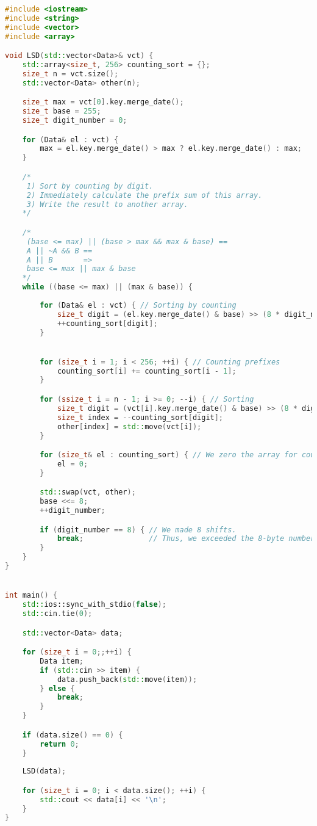 \begin{lstlisting}[language=C++]
#include <iostream>
#include <string>
#include <vector>
#include <array>

void LSD(std::vector<Data>& vct) {
    std::array<size_t, 256> counting_sort = {};
    size_t n = vct.size();
    std::vector<Data> other(n);

    size_t max = vct[0].key.merge_date();
    size_t base = 255;
    size_t digit_number = 0;

    for (Data& el : vct) {
        max = el.key.merge_date() > max ? el.key.merge_date() : max;
    }

    /*
     1) Sort by counting by digit.
     2) Immediately calculate the prefix sum of this array.
     3) Write the result to another array.
    */

    /*
     (base <= max) || (base > max && max & base) ==
     A || ~A && B ==
     A || B       =>
     base <= max || max & base
    */
    while ((base <= max) || (max & base)) {
        
        for (Data& el : vct) { // Sorting by counting
            size_t digit = (el.key.merge_date() & base) >> (8 * digit_number); // Specific number in the 256 system
            ++counting_sort[digit];
        }


        for (size_t i = 1; i < 256; ++i) { // Counting prefixes
            counting_sort[i] += counting_sort[i - 1];
        }

        for (ssize_t i = n - 1; i >= 0; --i) { // Sorting
            size_t digit = (vct[i].key.merge_date() & base) >> (8 * digit_number);
            size_t index = --counting_sort[digit];
            other[index] = std::move(vct[i]);
        }

        for (size_t& el : counting_sort) { // We zero the array for counting sorting.
            el = 0;
        }

        std::swap(vct, other);
        base <<= 8;
        ++digit_number;

        if (digit_number == 8) { // We made 8 shifts.
            break;               // Thus, we exceeded the 8-byte number.
        }
    }    
}


int main() {
    std::ios::sync_with_stdio(false);
    std::cin.tie(0);

    std::vector<Data> data;

    for (size_t i = 0;;++i) {
        Data item;
        if (std::cin >> item) {
            data.push_back(std::move(item));
        } else {
            break;
        }
    }

    if (data.size() == 0) {
        return 0;
    }
    
    LSD(data);

    for (size_t i = 0; i < data.size(); ++i) {
        std::cout << data[i] << '\n';
    }
}
\end{lstlisting}

